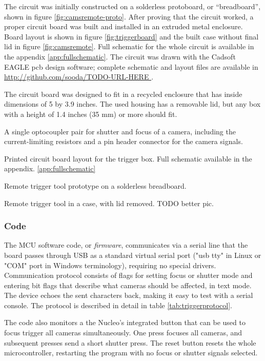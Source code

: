 The circuit was initially constructed on a solderless protoboard, or ``breadboard'', shown in figure \ref{fig:camsremote-proto}.
After proving that the circuit worked, a proper circuit board was built and installed in an extruded metal enclosure.
Board layout is shown in figure \ref{fig:triggerboard} and the built case without final lid in figure \ref{fig:camsremote}.
Full schematic for the whole circuit is available in the appendix \ref{app:fullschematic}.
The circuit was drawn with the Cadsoft EAGLE pcb design software; complete schematic and layout files are available in \url { http://github.com/sooda/TODO-URL-HERE }.

The circuit board was designed to fit in a recycled enclosure that has inside dimensions of 5 by 3.9 inches.
The used housing has a removable lid, but any box with a height of 1.4 inches (35 mm) or more should fit.

{A single optocoupler pair for shutter and focus of a camera, including the current-limiting resistors and a pin header connector for the camera signals.}

{Printed circuit board layout for the trigger box. Full schematic available in the appendix. \ref{app:fullschematic}}

{Remote trigger tool prototype on a solderless breadboard.}

{Remote trigger tool in a case, with lid removed. TODO better pic.}

\subsubsection{Code}

The MCU software code, or \emph{firmware}, communicates via a serial line that the board passes through USB as a standard virtual serial port ("usb tty" in Linux or "COM" port in Windows terminology), requiring no special drivers.
Communication protocol consists of flags for setting focus or shutter mode and entering bit flags that describe what cameras should be affected, in text mode.
The device echoes the sent characters back, making it easy to test with a serial console.
The protocol is described in detail in table \ref{tab:triggerprotocol}.

The code also monitors a the Nucleo's integrated button that can be used to focus trigger all cameras simultaneously.
One press focuses all cameras, and subsequent presses send a short shutter press.
The reset button resets the whole microcontroller, restarting the program with no focus or shutter signals selected.

